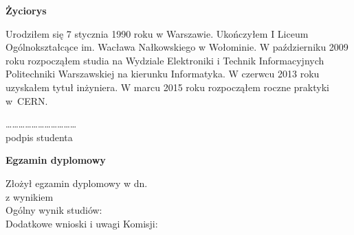 \vspace{10mm} 

\begin{center}
\textbf{Życiorys}
\end{center}

Urodziłem się 7 stycznia 1990 roku w Warszawie. 
Ukończyłem I Liceum Ogólnokształcące im. Wacława Nałkowskiego w Wołominie.
W październiku 2009 roku rozpocząłem studia na Wydziale Elektroniki i Technik Informacyjnych Politechniki Warszawskiej na kierunku Informatyka. W czerwcu 2013 roku uzyskałem tytuł inżyniera. W marcu 2015 roku rozpocząłem roczne praktyki \mbox{w CERN}. 

	 
\begin{flushright}

\dots\dots\dots\dots\dots\dots\dots\dots\dots\dots\dots \\
    \fontsize{9pt}{9pt}\selectfont
      podpis studenta\hspace{18mm}\null
\end{flushright}

\begin{flushleft}
\begin{center}
\vspace{15mm}
\textbf{Egzamin dyplomowy}
\vspace{5mm} \\
\end{center}

Złożył egzamin dyplomowy w dn. \manydots	 
\vspace{5mm} \\
z wynikiem \manydots 	
\vspace{5mm} \\
Ogólny wynik studiów: \manydots	 
\vspace{5mm} \\
Dodatkowe wnioski i uwagi Komisji: \manydots	 
\manydots \\ 
\vspace{5mm}
\manydots
\end{flushleft}
	
